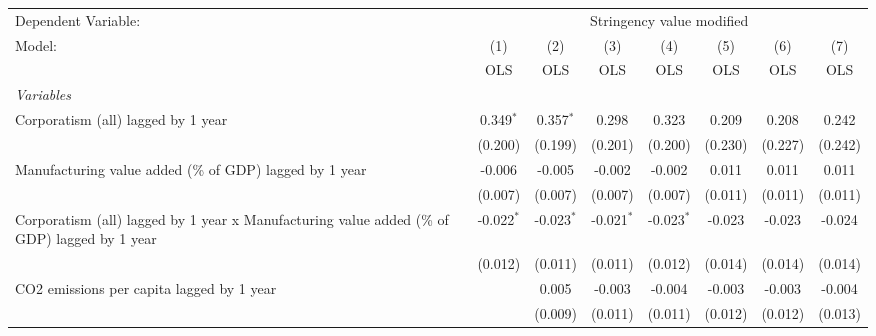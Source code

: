 
\begingroup
\centering
\begin{tabular}{lccccccc}
   \toprule
   Dependent Variable: & \multicolumn{7}{c}{Stringency value modified}\\
   Model:                                                                                       & (1)          & (2)          & (3)          & (4)          & (5)          & (6)          & (7)\\  
                                                                                                &  OLS         & OLS          & OLS          & OLS          & OLS          & OLS          & OLS\\  
   \midrule
   \emph{Variables}\\
   Corporatism (all) lagged by 1 year                                                           & 0.349$^{*}$  & 0.357$^{*}$  & 0.298        & 0.323        & 0.209        & 0.208        & 0.242\\   
                                                                                                & (0.200)      & (0.199)      & (0.201)      & (0.200)      & (0.230)      & (0.227)      & (0.242)\\   
   Manufacturing value added (\% of GDP) lagged by 1 year                                       & -0.006       & -0.005       & -0.002       & -0.002       & 0.011        & 0.011        & 0.011\\   
                                                                                                & (0.007)      & (0.007)      & (0.007)      & (0.007)      & (0.011)      & (0.011)      & (0.011)\\   
   Corporatism (all) lagged by 1 year x Manufacturing value added (\% of GDP) lagged by 1 year  & -0.022$^{*}$ & -0.023$^{*}$ & -0.021$^{*}$ & -0.023$^{*}$ & -0.023       & -0.023       & -0.024\\   
                                                                                                & (0.012)      & (0.011)      & (0.011)      & (0.012)      & (0.014)      & (0.014)      & (0.014)\\   
   CO2 emissions per capita lagged by 1 year                                                    &              & 0.005        & -0.003       & -0.004       & -0.003       & -0.003       & -0.004\\   
                                                                                                &              & (0.009)      & (0.011)      & (0.011)      & (0.012)      & (0.012)      & (0.013)\\   

\end{tabular}
